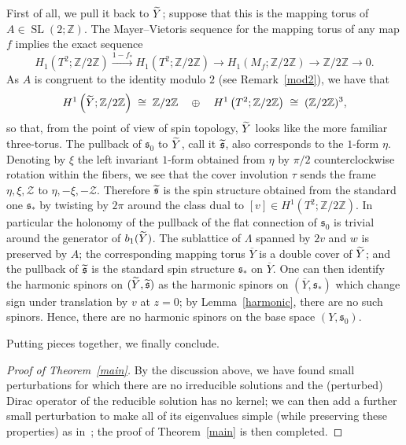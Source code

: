 \documentclass[11pt]{article}
\theoremstyle{definition}
\numberwithin{equation}{section}
\numberwithin{figure}{section}
\numberwithin{table}{section}
\newcommand{\spin}{\mathfrak{s}}
\DeclareMathOperator{\SL}{SL}
\let\oldtilde\tilde
\renewcommand*{\tilde}[1]{\mathchoice{\widetilde{#1}}{\widetilde{#1}}{\oldtilde{#1}}{\oldtilde{#1}}}\let\oldhat\hat
\renewcommand*{\hat}[1]{\mathchoice{\widehat{#1}}{\widehat{#1}}{\oldhat{#1}}{\oldhat{#1}}}
\begin{document}
First of all, we pull it back to $\tilde{Y}$; suppose that this is the mapping torus of $A\in\SL(2;\mathbb{Z})$. The Mayer--Vietoris sequence for the mapping torus of any map $f$ implies the exact sequence
\[
H_1\left(T^2;\mathbb{Z}/2\mathbb{Z}\right)\stackrel{1-f_*}{\rightarrow} H_1\left(T^2;\mathbb{Z}/2\mathbb{Z}\right)\rightarrow H_1\left(M_f;\mathbb{Z}/2\mathbb{Z}\right)\rightarrow \mathbb{Z}/2\mathbb{Z}\rightarrow 0.
\]
As $A$ is congruent to the identity modulo $2$ (see Remark~\ref{mod2}), we have that
\[
H^1\left(\tilde{Y};\mathbb{Z}/2\mathbb{Z}\right)\;\cong\;\mathbb{Z}/2\mathbb{Z}\quad\oplus\quad H^1\left(T^2;\mathbb{Z}/2\mathbb{Z}\right)\;\cong\;(\mathbb{Z}/2\mathbb{Z})^3,
\]
so that, from the point of view of spin topology, $\tilde{Y}$ looks like the more familiar three-torus. The pullback of $\spin_0$ to $\tilde{Y}$, call it $\tilde{\spin}$, also corresponds to the $1$-form $\eta$. Denoting by $\xi$ the left invariant $1$-form obtained from $\eta$ by $\pi/2$ counterclockwise rotation within the fibers, we see that the cover involution $\tau$ sends the frame $\eta,\xi,\mathcal{Z}$ to $\eta,-\xi,-\mathcal{Z}$. Therefore $\tilde{\spin}$ is the spin structure obtained from the standard one $\spin_*$ by twisting by $2\pi$ around the class dual to $[v]\in H^1(T^2;\mathbb{Z}/2\mathbb{Z})$. In particular the holonomy of the pullback of the flat connection of $\spin_0$ is trivial around the generator of $b_1(\tilde{Y})$. The sublattice of $\Lambda$ spanned by $2v$ and $w$ is preserved by $A$; the corresponding mapping torus ${\overline{Y}}$ is a double cover of $\tilde{Y}$; and the pullback of $\tilde{\spin}$ is the standard spin structure $\spin_*$ on ${\overline{Y}}$. One can then identify the harmonic spinors on $(\tilde{Y},\tilde{\spin})$ as the harmonic spinors on $({\overline{Y}},\spin_*)$ which change sign under translation by $v$ at $z=0$; by Lemma~\ref{harmonic}, there are no such spinors. Hence, there are no harmonic spinors on the base space $(Y,\spin_0)$.


Putting pieces together, we finally conclude.


\begin{proof}[Proof of Theorem~\ref{main}]By the discussion above, we have found small perturbations for which there are no irreducible solutions and the (perturbed) Dirac operator of the reducible solution has no kernel; we can then add a further small perturbation to make all of its eigenvalues simple (while preserving these properties) as in~\cite[Chapter~12]{KM}; the proof of Theorem~\ref{main} is then completed.
\end{proof}
\end{document}
